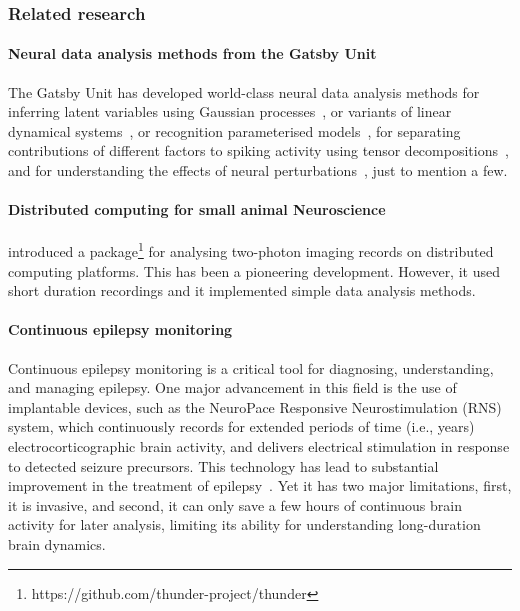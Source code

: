 \documentclass[12pt]{article}
\begin{document}
\subsubsection{Related research}
\label{sec:relatedResearchOfflineAnalysis}

\paragraph{Neural data analysis methods from the Gatsby Unit}
%
The Gatsby Unit has developed world-class neural data analysis methods for
%
inferring latent variables using Gaussian
processes~\citep{yuEtAl09,dunckerAndSahani18,ruttenEtAl20,yuEtAl24}, or variants
of linear dynamical systems~\citep{buesinEtAl12,mackeEtAl15}, or recognition
parameterised models~\citep{walkerEtAl23},
%
for separating contributions of different factors to spiking activity using
tensor decompositions~\citep{soulatEtAl21},
%
and for understanding the effects of neural perturbations~\citep{oSheaEtAl22},
just to mention a few.

\paragraph{Distributed computing for small animal Neuroscience}
%
\citet{freemanEtAl14} introduced a
package\footnote{https://github.com/thunder-project/thunder} for analysing
two-photon imaging records on distributed computing platforms.  This has
been a pioneering development. However, it used short duration recordings and
it implemented simple data analysis methods.

\paragraph{Continuous epilepsy monitoring}
%
Continuous epilepsy monitoring is a critical tool for diagnosing,
understanding, and managing epilepsy.
%
One major advancement in this field is the use of implantable devices, such as
the NeuroPace Responsive Neurostimulation (RNS) system, which continuously
records for extended periods of time (i.e., years) electrocorticographic brain
activity, and delivers electrical stimulation in response to detected seizure
precursors.
%
This  technology has lead to substantial improvement in the treatment of
epilepsy~\citep{rao21}. Yet it has two major limitations, first, it is
invasive, and second, it can only save a few hours of continuous brain activity
for later analysis, limiting its ability for understanding long-duration brain
dynamics.
\end{document}
